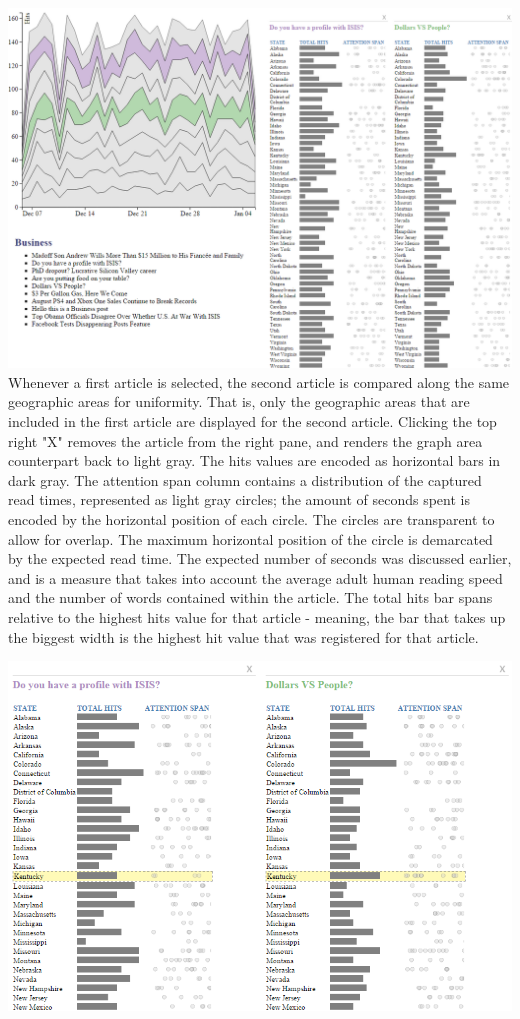 \documentclass[12pt]{article}
\begin{document}
\noindent\includegraphics[scale=0.5]{img/viz_8} \\

Whenever a first article is selected, the second article is compared along the same geographic areas for uniformity. That is, only the geographic areas that are included in the first article are displayed for the second article. Clicking the top right "X" removes the article from the right pane, and renders the graph area counterpart back to light gray. 
The hits values are encoded as horizontal bars in dark gray. The attention span column contains a distribution of the captured read times, represented as light gray circles; the amount of seconds spent is encoded by the horizontal position of each circle. The circles are transparent to allow for overlap. The maximum horizontal position of the circle is demarcated by the expected read time. The expected number of seconds was discussed earlier, and is a measure that takes into account the average adult human reading speed and the number of words contained within the article. The total hits bar spans relative to the highest hits value for that article - meaning, the bar that takes up the biggest width is the highest hit value that was registered for that article. 

\vfill

\noindent\includegraphics[scale=0.8]{img/viz_9} \\
\end{document}
